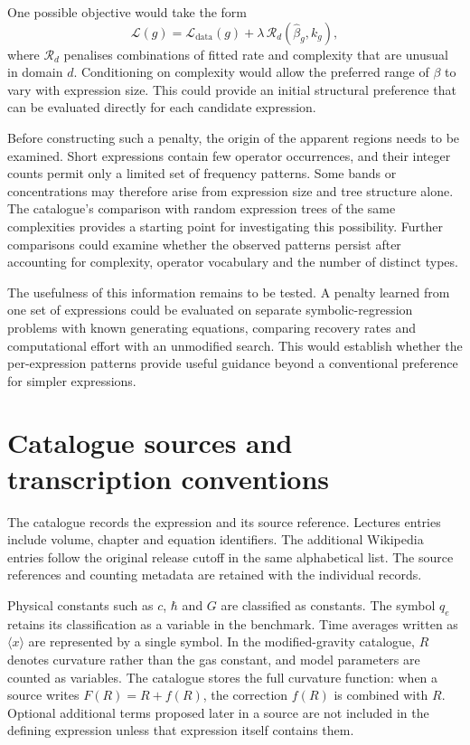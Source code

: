 \documentclass[10pt]{article}
\begin{document}
One possible objective would take the form
\begin{equation}
\mathcal{L}(g)
=
\mathcal{L}_{\mathrm{data}}(g)
+
\lambda\,\mathcal{R}_{d}(\hat\beta_g,k_g),
\end{equation}
where $\mathcal{R}_{d}$ penalises combinations of fitted rate and complexity that are unusual in domain $d$. Conditioning on complexity would allow the preferred range of $\beta$ to vary with expression size. This could provide an initial structural preference that can be evaluated directly for each candidate expression.

Before constructing such a penalty, the origin of the apparent regions needs to be examined. Short expressions contain few operator occurrences, and their integer counts permit only a limited set of frequency patterns. Some bands or concentrations may therefore arise from expression size and tree structure alone. The catalogue's comparison with random expression trees of the same complexities provides a starting point for investigating this possibility. Further comparisons could examine whether the observed patterns persist after accounting for complexity, operator vocabulary and the number of distinct types.

The usefulness of this information remains to be tested. A penalty learned from one set of expressions could be evaluated on separate symbolic-regression problems with known generating equations, comparing recovery rates and computational effort with an unmodified search. This would establish whether the per-expression patterns provide useful guidance beyond a conventional preference for simpler expressions.




\clearpage
\appendix
\section{Catalogue sources and transcription conventions}\label{app:catalogue}
The catalogue records the expression and its source reference. Lectures entries include volume, chapter and equation identifiers. The additional Wikipedia entries follow the original release cutoff in the same alphabetical list. The source references and counting metadata are retained with the individual records.

Physical constants such as $c$, $\hbar$ and $G$ are classified as constants. The symbol $q_e$ retains its classification as a variable in the benchmark. Time averages written as $\langle x\rangle$ are represented by a single symbol. In the modified-gravity catalogue, $R$ denotes curvature rather than the gas constant, and model parameters are counted as variables. The catalogue stores the full curvature function: when a source writes $F(R)=R+f(R)$, the correction $f(R)$ is combined with $R$. Optional additional terms proposed later in a source are not included in the defining expression unless that expression itself contains them.
\end{document}
